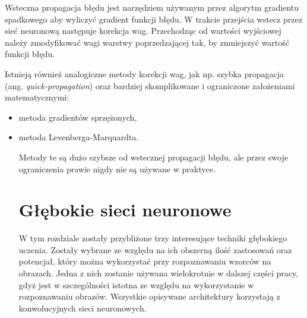 \documentclass[12pt,a4paper,twoside,titlepage,openright]{book}
\begin{document}
Wsteczna propagacja błędu jest narzędziem używanym przez algorytm gradientu spadkowego aby wyliczyć gradient funkcji błędu. W trakcie przejścia wstecz przez sieć neuronową następuje korekcja wag. Przechodząc od wartości wyjściowej należy zmodyfikować wagi warstwy poprzedzającej tak, by zmniejszyć wartość funkcji błędu.

Istnieją również analogiczne metody korekcji wag, jak np. szybka propagacja (ang. \textit{quick-propagation}) oraz bardziej skomplikowane i ograniczone założeniami matematycznymi: 
\begin{itemize}
\item metoda gradientów sprzężonych, 
\item metoda Levenberga-Marquardta. 

Metody te są dużo szybsze od wstecznej propagacji błędu, ale przez swoje ograniczenia prawie nigdy nie są używane w praktyce.\cite{odkrywanieSieci}


\chapter{Głębokie sieci neuronowe}
W tym rozdziale zostały przybliżone trzy interesujące techniki głębokiego uczenia. Zostały wybrane ze względu na ich obszerną ilość zastosowań oraz potencjał, który można wykorzystać przy rozpoznawaniu wzorców na obrazach. Jedna z nich zostanie używana wielokrotnie w dalszej części pracy, gdyż jest w szczególności istotna ze względu na wykorzystanie w rozpoznawaniu obrazów. Wszystkie opisywane architektury korzystają z konwolucyjnych sieci neuronowych.

\end{itemize}
\end{document}
